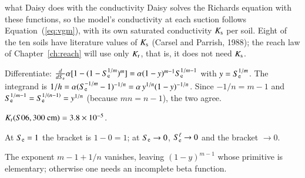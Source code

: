 \begin{daisybox}{what Daisy does with the conductivity}
Daisy solves the Richards equation with these functions, so the model's conductivity at each suction follows Equation~(\ref{eq:vgm}), with its own saturated conductivity $K_{\mathrm s}$ per soil. Eight of the ten soils have literature values of $K_{\mathrm s}$ (Carsel and Parrish, 1988); the reach law of Chapter~\ref{ch:reach} will use only $K_{\mathrm r}$, that is, it does not need $K_{\mathrm s}$.
\end{daisybox}

\sol  Differentiate: $\frac{d}{dS_{\mathrm e}}\alpha[1-(1-S_{\mathrm e}^{1/m})^m]=\alpha(1-y)^{m-1}S_{\mathrm e}^{1/m-1}$ with $y=S_{\mathrm e}^{1/m}$. The integrand is $1/h=\alpha(S_{\mathrm e}^{-1/m}-1)^{-1/n}=\alpha\,y^{1/n}(1-y)^{-1/n}$. Since $-1/n=m-1$ and $S_{\mathrm e}^{1/m-1}=S_{\mathrm e}^{1/(n-1)}=y^{1/n}$ (because $mn=n-1$), the two agree.

\sol  $K_{\mathrm r}(S06,300\text{ cm})=3.8\times10^{-5}$.

\sol  At $S_{\mathrm e}=1$ the bracket is $1-0=1$; at $S_{\mathrm e}\to0$, $S_{\mathrm e}^\ell\to0$ and the bracket $\to0$.

\sol  The exponent $m-1+1/n$ vanishes, leaving $(1-y)^{m-1}$ whose primitive is elementary; otherwise one needs an incomplete beta function.

